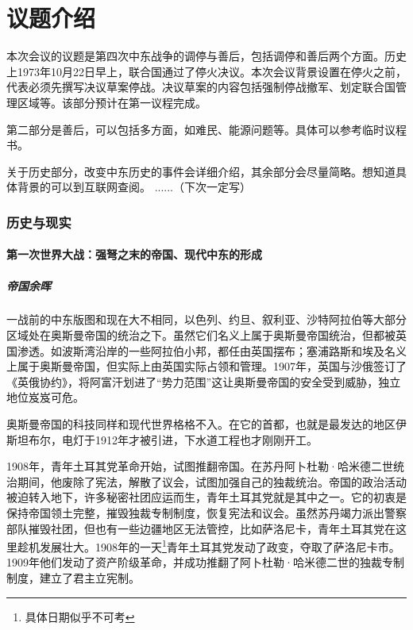 \documentclass{article}
\begin{document}
\part{议题介绍}
本次会议的议题是第四次中东战争的调停与善后，包括调停和善后两个方面。历史上1973年10月22日早上，联合国通过了停火决议。本次会议背景设置在停火之前，代表必须先撰写决议草案停战。决议草案的内容包括强制停战撤军、划定联合国管理区域等。该部分预计在第一议程完成。

第二部分是善后，可以包括多方面，如难民、能源问题等。具体可以参考临时议程书。

关于历史部分，改变中东历史的事件会详细介绍，其余部分会尽量简略。想知道具体背景的可以到互联网查阅。
......（下次一定写）
\section{历史与现实}
\subsection{第一次世界大战：强弩之末的帝国、现代中东的形成}
\subsubsection{帝国余晖}
一战前的中东版图和现在大不相同，以色列、约旦、叙利亚、沙特阿拉伯等大部分区域处在奥斯曼帝国的统治之下。虽然它们名义上属于奥斯曼帝国统治，但都被英国渗透。如波斯湾沿岸的一些阿拉伯小邦，都任由英国摆布；塞浦路斯和埃及名义上属于奥斯曼帝国，但实际上由英国实际占领和管理。1907年，英国与沙俄签订了《英俄协约》，将阿富汗划进了“势力范围”这让奥斯曼帝国的安全受到威胁，独立地位岌岌可危。

奥斯曼帝国的科技同样和现代世界格格不入。在它的首都，也就是最发达的地区伊斯坦布尔，电灯于1912年才被引进，下水道工程也才刚刚开工。

1908年，青年土耳其党革命开始，试图推翻帝国。在苏丹阿卜杜勒·哈米德二世统治期间，他废除了宪法，解散了议会，试图加强自己的独裁统治。帝国的政治活动被迫转入地下，许多秘密社团应运而生，青年土耳其党就是其中之一。它的初衷是保持帝国领土完整，摧毁独裁专制制度，恢复宪法和议会。虽然苏丹竭力派出警察部队摧毁社团，但也有一些边疆地区无法管控，比如萨洛尼卡，青年土耳其党在这里趁机发展壮大。1908年的一天\footnote{具体日期似乎不可考}青年土耳其党发动了政变，夺取了萨洛尼卡市。1909年他们发动了资产阶级革命，并成功推翻了阿卜杜勒·哈米德二世的独裁专制制度，建立了君主立宪制。
\end{document}
